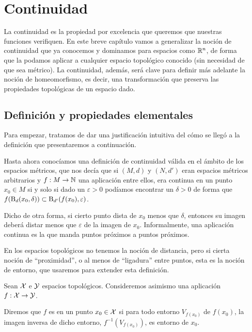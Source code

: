 \chapter{Continuidad}
\label{cont}

La continuidad es la propiedad por excelencia que queremos que nuestras funciones verifiquen. En este breve capítulo vamos a generalizar la noción de continuidad que ya conocemos y dominamos para espacios como $\mathbb{R}^n$, de forma que la podamos aplicar a cualquier espacio topológico conocido (sin necesidad de que sea métrico). La continuidad, además, será clave para definir más adelante la noción de homeomorfismo, es decir, una transformación que preserva las propiedades topológicas de un espacio dado.

\section{Definición y propiedades elementales}

Para empezar, tratamos de dar una justificación intuitiva del cómo se llegó a la definición que presentaremos a continuación.

Hasta ahora conocíamos una definición de continuidad válida en el ámbito de los espacios métricos, que nos decía que si $(M,d)$ y $(N,d')$ eran espacios métricos arbitrarios y $f:M\to\mathbb{N}$ una aplicación entre ellos, era continua en un punto $x_0\in M$ si y solo si dado un $\varepsilon>0$ podíamos encontrar un $\delta>0$ de forma que $f(\operatorname{B}_d(x_0,\delta))\subset\operatorname{B}_{d'}(f(x_0),\varepsilon)$.

Dicho de otra forma, si cierto punto dista de $x_0$ menos que $\delta$, entonces su imagen deberá distar menos que $\varepsilon$ de la imagen de $x_0$. Informalmente, una aplicación continua es la que manda puntos próximos a puntos próximos.

En los espacios topológicos no tenemos la noción de distancia, pero si cierta noción de ``proximidad'', o al menos de ``ligadura'' entre puntos, esta es la noción de entorno, que usaremos para extender esta definición.
\begin{defi}
	Sean $\mathcal{X}$ e $\mathcal{Y}$ espacios topológicos. Consideremos asimismo una aplicación $f:\mathcal{X}\to\mathcal{Y}$.
	
	Diremos que $f$ es  en un punto $x_0\in\mathcal{X}$ si para todo entorno $V_{f(x_0)}$ de $f(x_0)$, la imagen inversa de dicho entorno, $f^{-1}(V_{f(x_0)})$, es entorno de $x_0$. 
\end{defi}


